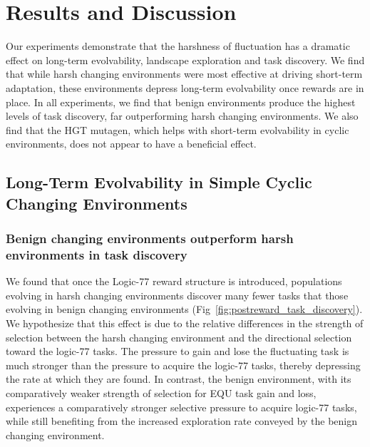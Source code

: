 \documentclass[PhD]{msu-thesis}
\begin{document}
\section{Results and Discussion}

Our experiments demonstrate that the harshness of fluctuation has a dramatic effect on long-term evolvability, landscape exploration and task discovery. We find that while harsh changing environments were most effective at driving short-term adaptation, these environments depress long-term evolvability once rewards are in place. In all experiments, we find that benign environments produce the highest levels of task discovery, far outperforming harsh changing environments. We also find that the HGT mutagen, which helps with short-term evolvability in cyclic environments, does not appear to have a beneficial effect.

\subsection{Long-Term Evolvability in Simple Cyclic Changing Environments}

\subsubsection{Benign changing environments outperform harsh environments in task discovery}
We found that once the Logic-77 reward structure is introduced, populations evolving in harsh changing environments discover many fewer tasks that those evolving in benign changing environments (Fig~\ref{fig:postreward_task_discovery}). We hypothesize that this effect is due to the relative differences in the strength of selection between the harsh changing environment and the directional selection toward the logic-77 tasks. The pressure to gain and lose the fluctuating task is much stronger than the pressure to acquire the logic-77 tasks, thereby depressing the rate at which they are found.
In contrast, the benign environment, with its comparatively weaker strength of selection for EQU task gain and loss, experiences a comparatively stronger selective pressure to acquire logic-77 tasks, while still benefiting from the increased exploration rate conveyed by the benign changing environment.
\end{document}
